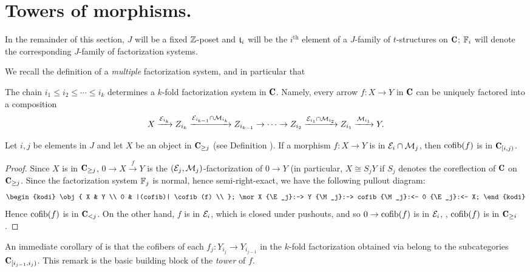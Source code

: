 \documentclass[a4paper,12pt]{amsart}
\begin{document}
\section{Towers of morphisms.}

In the remainder of this section, $J$ will be a fixed $\mathbb{Z}$-poset and $\mathfrak{t}_i$ will be the $i^\text{th}$ element of a $J$-family of $t$-structures on $\C$; $\mathbb{F}_i$ will denote the corresponding $J$-family of factorization systems.

We recall the definition of a \emph{multiple} factorization system, and in particular that
\begin{lemma}\label{k.fold.fact}
The chain $i_1\leq i_2\leq\cdots\leq i_k$ determines a $k$-fold factorization system in $\C$. Namely, every arrow $f\colon X\to Y$ in $\C$ can be uniquely factored into a composition
\[
X \xrightarrow{\mathcal{E}_{i_k}} Z_{i_k} \xrightarrow{\mathcal{E}_{i_{k-1}}\cap \mathcal{M}_{i_k}} Z_{i_{k-1}}\to\dots\to Z_{i_{2}} \xrightarrow{\mathcal{E}_{i_{1}}\cap \mathcal{M}_{i_{2}}} Z_{i_1} \xrightarrow{\mathcal{M}_{i_{1}}} Y.
\]
\end{lemma}
\begin{lemma}\label{versa.vice}
Let $i,j$ be elements in $J$ and let $X$ be an object in $\C_{\geq j}$ (see Definition ). If a morphism $f\colon X\to Y$ is in $\mathcal{E}_{i}\cap \mathcal{M}_{j}$, then $\operatorname{cofib}(f)$ is in $\C_{[i,j)}$.\end{lemma}
\begin{proof}
Since $X$ is in $\C_{\geq j}$, $0\to X\xrightarrow{f} Y$ is the $(\mathcal{E}_j,\mathcal{M}_j)$-factorization of $0\to Y$ (in particular, $X\cong S_jY$ if $S_j$ denotes the coreflection of $\C$ on $\C_{\ge j}$. Since the factorization system $\mathbb{F}_j$ is normal, hence semi-right-exact, we have the following pullout diagram:
\[
\begin{kodi}
\obj{
	X & Y \\
	0 & |(cofib)| \cofib(f) \\
};
\mor X {\E_j}:-> Y {\M_j}:-> cofib {\M_j}:<- 0 {\E_j}:<- X;
\end{kodi}
\]
Hence $\operatorname{cofib}(f)$ is in $\C_{<j}$. On the other hand, $f$ is in $\mathcal{E}_i$, which is closed under pushouts, and so $0\to \operatorname{cofib}(f)$ is in $\mathcal{E}_i$, \ie, $\operatorname{cofib}(f)$ is in $\C_{\geq i}$.
\end{proof}
An immediate corollary of  is that the cofibers of each $f_j\colon Y_{i_j}\to Y_{i_{j-1}}$ in the $k$-fold factorization obtained via  belong to the subcategories $\C_{[i_{j-1},i_j)}$. This remark is the basic building block of the \emph{tower} of $f$.
\end{document}
